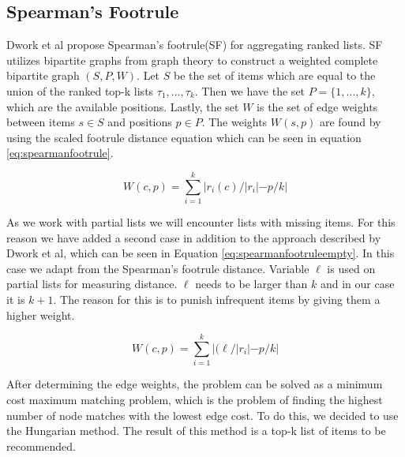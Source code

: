 \subsection{Spearman's Footrule}\label{sec:spearmansfootrule}
Dwork et al propose Spearman's footrule(SF) for aggregating ranked lists\citep{rank:aggregation}.
SF utilizes bipartite graphs from graph theory to construct a weighted complete bipartite graph $(S,P,W)$.
Let $S$ be the set of items which are equal to the union of the ranked top-k lists $\tau_1, ..., \tau_k$. Then we have the set $P = \{1,...,k\}$, which are the available positions. Lastly, the set $W$ is the set of edge weights between items $s\in S$ and positions $p\in P$. The weights $W(s,p)$ are found by using the scaled footrule distance equation which can be seen in equation \ref{eq:spearmanfootrule}.
 
\begin{equation}\label{eq:spearmanfootrule}
W(c,p) = \displaystyle\sum_{i=1}^{k} |r_i(c)/|r_i| - p/k|
\end{equation}

As we work with partial lists we will encounter lists with missing items. For this reason we have added a second case in addition to the approach described by Dwork et al, which can be seen in Equation \ref{eq:spearmanfootruleempty}. In this case we adapt from the Spearman's footrule distance. Variable $\ell$ is used on partial lists for measuring distance. $\ell$ needs to be larger than $k$ and in our case it is $k + 1$. The reason for this is to punish infrequent items by giving them a higher weight.

\begin{equation}\label{eq:spearmanfootruleempty}
W(c,p) = \displaystyle\sum_{i=1}^{k} |(\ell/|r_i| - p/k|
\end{equation}

After determining the edge weights, the problem can be solved as a minimum cost maximum matching problem, which is the problem of finding the highest number of node matches with the lowest edge cost. To do this, we decided to use the Hungarian method. The result of this method is a top-k list of items to be recommended.